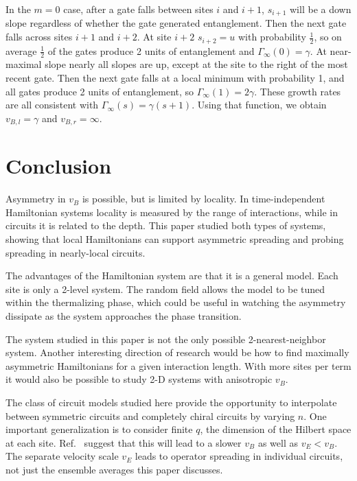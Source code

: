 \documentclass[aps,prx,reprint,superscriptaddress, longbibliography]{revtex4-1}
\newcommand{\half}{\frac{1}{2}}
\begin{document}
In the $m = 0$ case, after a gate falls between sites $i$ and $i + 1$, $s_{i+1}$ will be a down slope regardless of whether the gate generated entanglement. Then the next gate falls across sites $i + 1$ and $i+2$. At site $i+2$ $s_{i+2} = u$ with probability $\half$, so on average $\half$ of the gates produce 2 units of entanglement and $\Gamma_\infty(0)=\gamma$. At near-maximal slope nearly all slopes are up, except at the site to the right of the most recent gate. Then the next gate falls at a local minimum with probability 1, and all gates produce 2 units of entanglement, so $\Gamma_\infty(1)=2\gamma$. These growth rates are all consistent with $\Gamma_\infty(s)=\gamma(s+1)$. Using that function, we obtain $v_{B,l}=\gamma$ and $v_{B,r}=\infty$.

\section{Conclusion}

Asymmetry in $v_B$ is possible, but is limited by locality. In time-independent Hamiltonian systems locality is measured by the range of interactions, while in circuits it is related to the depth. This paper studied both types of systems, showing that local Hamiltonians can support asymmetric spreading and probing spreading in nearly-local circuits. 

The advantages of the Hamiltonian system are that it is a general model. Each site is only a 2-level system. The random field allows the model to be tuned within the thermalizing phase, which could be useful in watching the asymmetry dissipate as the system approaches the phase transition. 

The system studied in this paper is not the only possible 2-nearest-neighbor system. Another interesting direction of research would be how to find maximally asymmetric Hamiltonians for a given interaction length. With more sites per term it would also be possible to study 2-D systems with anisotropic $v_B$.

The class of circuit models studied here provide the opportunity to interpolate between symmetric circuits and completely chiral circuits by varying $n$. One important generalization is to consider finite $q$, the dimension of the Hilbert space at each site. Ref.~\cite{KeyserlingkHydro} suggest that this will lead to a slower $v_B$ as well as $v_E<v_B$. The separate velocity scale $v_E$ leads to operator spreading in individual circuits, not just the ensemble averages this paper discusses.
\end{document}
